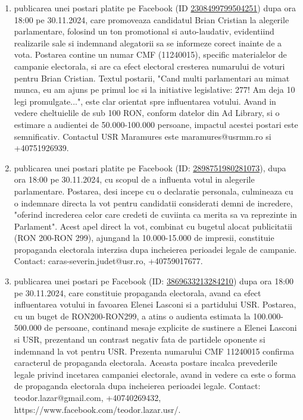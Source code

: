\documentclass[a4paper,12pt]{article}
\begin{document}
\begin{enumerate}[leftmargin=*, label=\arabic*.)]
    \item publicarea unei postari platite pe Facebook (ID \href{https://www.facebook.com/ads/library/?id=2308499799504251}{2308499799504251}) dupa ora 18:00 pe 30.11.2024, care promoveaza candidatul Brian Cristian la alegerile parlamentare,  folosind un ton promotional si auto-laudativ, evidentiind realizarile sale si indemnand alegatorii sa se informeze corect inainte de a vota. Postarea contine un numar CMF (11240015), specific materialelor de campanie electorala, si are ca efect electoral cresterea numarului de voturi pentru Brian Cristian.  Textul postarii, "Cand multi parlamentari au mimat munca, eu am ajuns pe primul loc si la initiative legislative: 277! Am deja 10 legi promulgate...", este clar orientat spre influentarea votului.  Avand in vedere cheltuielile de sub 100 RON, conform datelor din Ad Library, si o estimare a audientei de 50.000-100.000 persoane, impactul acestei postari este semnificativ.  Contactul USR Maramures este maramures@usrmm.ro si +40751926939.
    \item publicarea unei postari platite pe Facebook (ID: \href{https://www.facebook.com/ads/library/?id=2898751980281073}{2898751980281073}), dupa ora 18:00 pe 30.11.2024, cu scopul de a influenta votul in alegerile parlamentare. Postarea, desi incepe cu o declaratie personala, culmineaza cu o indemnare directa la vot pentru candidatii considerati demni de incredere,  "oferind increderea celor care credeti de cuviinta ca merita sa va reprezinte in Parlament".  Acest apel direct la vot, combinat cu bugetul alocat publicitatii (RON 200-RON 299),  ajungand la 10.000-15.000 de impresii, constituie propaganda electorala interzisa dupa incheierea perioadei legale de campanie.  Contact: caras-severin.judet@usr.ro, +40759017677.
    \item publicarea unei postari pe Facebook (ID: \href{https://www.facebook.com/ads/library/?id=3869633213284210}{3869633213284210}) dupa ora 18:00 pe 30.11.2024, care constituie propaganda electorala, avand ca efect influentarea votului in favoarea Elenei Lasconi si a partidului USR. Postarea, cu un buget de RON200-RON299, a atins o audienta estimata la 100.000-500.000 de persoane, continand mesaje explicite de sustinere a Elenei Lasconi si USR, prezentand un contrast negativ fata de partidele oponente si indemnand la vot pentru USR. Prezenta numarului CMF 11240015 confirma caracterul de propaganda electorala.  Aceasta postare incalca prevederile legale privind incetarea campaniei electorale, avand in vedere ca este o forma de propaganda electorala dupa incheierea perioadei legale.  Contact: teodor.lazar@gmail.com, +40740269432, https://www.facebook.com/teodor.lazar.usr/.

\end{enumerate}
\end{document}
